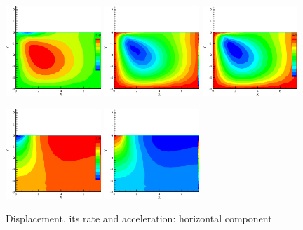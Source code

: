 \begin{figure}[!htb]
\begin{center}
\includegraphics[width=0.32\textwidth]{chapter_14/figures/fig_14_1_9_a}
\includegraphics[width=0.32\textwidth]{chapter_14/figures/fig_14_1_9_b}
\includegraphics[width=0.32\textwidth]{chapter_14/figures/fig_14_1_9_c}
\end{center}
\caption{Displacement, its rate and acceleration: horizontal component}
\label{fig_dynHM2}
\begin{center}
\includegraphics[width=0.32\textwidth]{chapter_14/figures/fig_14_1_10_a}
\includegraphics[width=0.32\textwidth]{chapter_14/figures/fig_14_1_10_b}

\end{center}
\end{figure}
